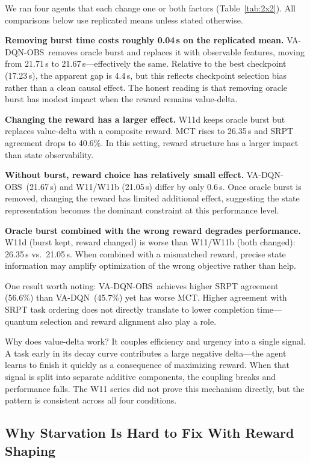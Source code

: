 \documentclass[10pt,twocolumn]{article}
\theoremstyle{remark}
\newcommand{\vadqn}{VA-DQN}
\newcommand{\vaobs}{VA-DQN-OBS}
\begin{document}
We ran four agents that each change one or both factors
(Table~\ref{tab:2x2}). All comparisons below use replicated means
unless stated otherwise.

\textbf{Removing burst time costs roughly 0.04\,s on the replicated
mean.} \vaobs\ removes oracle burst and replaces it with observable
features, moving from 21.71\,s to 21.67\,s---effectively the same.
Relative to the best checkpoint (17.23\,s), the apparent gap is
4.4\,s, but this reflects checkpoint selection bias rather than a
clean causal effect. The honest reading is that removing oracle burst
has modest impact when the reward remains value-delta.

\textbf{Changing the reward has a larger effect.} W11d keeps oracle
burst but replaces value-delta with a composite reward. MCT rises to
26.35\,s and SRPT agreement drops to 40.6\%. In this setting, reward
structure has a larger impact than state observability.

\textbf{Without burst, reward choice has relatively small effect.}
\vaobs\ (21.67\,s) and W11/W11b (21.05\,s) differ by only 0.6\,s.
Once oracle burst is removed, changing the reward has limited
additional effect, suggesting the state representation becomes the
dominant constraint at this performance level.

\textbf{Oracle burst combined with the wrong reward degrades
performance.} W11d (burst kept, reward changed) is worse than
W11/W11b (both changed): 26.35\,s vs.\ 21.05\,s. When combined with
a mismatched reward, precise state information may amplify
optimization of the wrong objective rather than help.

One result worth noting: \vaobs\ achieves higher SRPT agreement
(56.6\%) than \vadqn\ (45.7\%) yet has worse MCT. Higher agreement
with SRPT task ordering does not directly translate to lower
completion time---quantum selection and reward alignment also play a
role.

Why does value-delta work? It couples efficiency and urgency into a
single signal. A task early in its decay curve contributes a large
negative delta---the agent learns to finish it quickly as a
consequence of maximizing reward. When that signal is split into
separate additive components, the coupling breaks and performance
falls. The W11 series did not prove this mechanism directly, but the
pattern is consistent across all four conditions.

\subsection{Why Starvation Is Hard to Fix With Reward Shaping}
\label{sec:pbrs}
\end{document}
